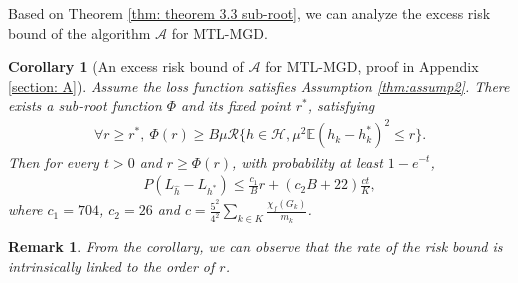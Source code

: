 \documentclass{article}
\def\eE{\mathbb{E}}
\newtheorem{corollary}{Corollary}
\newtheorem*{remark}{Remark}
\begin{document}
Based on Theorem \ref{thm: theorem 3.3 sub-root}, we can analyze the excess risk bound of the algorithm $\mathcal{A}$ for MTL-MGD. 
\begin{corollary}[An excess risk bound of $\mathcal{A}$ for MTL-MGD, proof in Appendix \ref{section: A}] \label{thm : Lipschitz bound loss space}
Assume the loss function satisfies Assumption \ref{thm:assump2}. 
There exists a sub-root function $\Phi$ and its fixed point $r^*$, satisfying
        \begin{align*}
           \forall r \geq r^*, ~  \Phi (r) \geq B \mu \mathcal{R} \{ h \in \mathcal{H}, \mu^2 \eE (h_k - h_k^*)^2 \leq r \}.
        \end{align*}
    Then for every $t > 0$ and $ r \geq \Phi(r)$, with probability at least $1 - e^{-t}$, 
    \begin{align} \label{eq: Plf excess risk bound} 
        P (L_ {\hat{h}} - L_{h^*}) \leq \frac{c_1 }{B} r + (c_2 B  + 22) \frac{ct}{K},  
    \end{align}
    where $c_1 = 704$, $c_2 = 26$ and $c = \frac{5^2}{4^2} \sum_{k \in K}\frac{\chi_f(G_k)}{m_k}$. 
\end{corollary}

\begin{remark}
    From the corollary, we can observe that the rate of the risk bound is intrinsically linked to the order of $r$. 
\end{remark}
\end{document}
